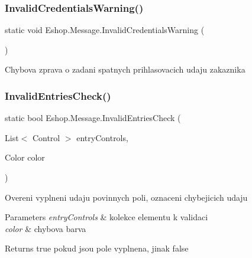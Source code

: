 \mbox{\label{class_eshop_1_1_message_ad267192472e20da18e864fb0b9ff99c7}} 
\subsubsection{\texorpdfstring{InvalidCredentialsWarning()}{InvalidCredentialsWarning()}}
{\footnotesize\ttfamily static void Eshop.\+Message.\+Invalid\+Credentials\+Warning (\begin{DoxyParamCaption}{ }\end{DoxyParamCaption})\hspace{0.3cm}{\ttfamily [static]}}



Chybova zprava o zadani spatnych prihlasovacich udaju zakaznika 

\mbox{\label{class_eshop_1_1_message_a39bfc2274d5690fd3c70f213fa048651}} 
\subsubsection{\texorpdfstring{InvalidEntriesCheck()}{InvalidEntriesCheck()}}
{\footnotesize\ttfamily static bool Eshop.\+Message.\+Invalid\+Entries\+Check (\begin{DoxyParamCaption}\item[{List$<$ Control $>$}]{entry\+Controls,  }\item[{Color}]{color }\end{DoxyParamCaption})\hspace{0.3cm}{\ttfamily [static]}}



Overeni vyplneni udaju povinnych poli, oznaceni chybejicich udaju 


\begin{DoxyParams}{Parameters}
{\em entry\+Controls} & kolekce elementu k validaci\\
\hline
{\em color} & chybova barva\\
\hline
\end{DoxyParams}
\begin{DoxyReturn}{Returns}
true pokud jsou pole vyplnena, jinak false
\end{DoxyReturn}
\mbox{\label{class_eshop_1_1_message_abf2f3c2c283038881294ed1837cc96dd}} 
